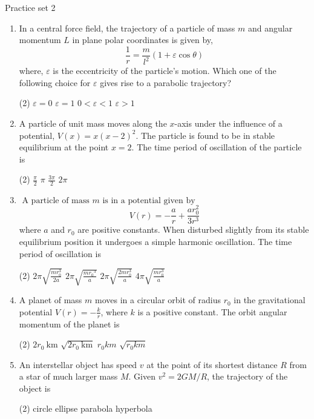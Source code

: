 \newpage
\begin{abox}
	Practice set 2
	\end{abox}
\begin{enumerate}
	\item In a central force field, the trajectory of a particle of mass $m$ and angular momentum $L$ in plane polar coordinates is given by,\\
	$$\frac{1}{r}=\frac{m}{l^{2}}(1+\varepsilon \cos \theta)$$
	where, $\varepsilon$ is the eccentricity of the particle's motion. Which one of the following choice for $\varepsilon$ gives rise to a parabolic trajectory?
	{}
\begin{tasks}(2)
	\task[\textbf{A.}] $\varepsilon=0$
	\task[\textbf{B.}]$\varepsilon=1$
	\task[\textbf{C.}] $0<\varepsilon<1$
	\task[\textbf{D.}] $\varepsilon>1$
\end{tasks}
	\item A particle of unit mass moves along the $x$-axis under the influence of a potential, $V(x)=x(x-2)^{2}$. The particle is found to be in stable equilibrium at the point $x=2$. The time period of oscillation of the particle is
	{}
\begin{tasks}(2)
	\task[\textbf{A.}] $\frac{\pi}{2}$
	\task[\textbf{B.}]$\pi$
	\task[\textbf{C.}]$\frac{3 \pi}{2}$
	\task[\textbf{D.}] $2 \pi$
\end{tasks}
	\item $\text { A particle of mass } m \text { is in a potential given by }$
	$$V(r)=-\frac{a}{r}+\frac{a r_{0}^{2}}{3 r^{3}}$$
	where $a$ and $r_{0}$ are positive constants. When disturbed slightly from its stable equilibrium position it undergoes a simple harmonic oscillation. The time period of oscillation is
	{}
\begin{tasks}(2)
	\task[\textbf{A.}] $2 \pi \sqrt{\frac{m r_{0}^{3}}{2 a}}$
	\task[\textbf{B.}]$2 \pi \sqrt{\frac{m r_{0}{ }^{3}}{a}}$
	\task[\textbf{C.}]$2 \pi \sqrt{\frac{2 m r_{0}^{3}}{a}}$
	\task[\textbf{D.}]$4 \pi \sqrt{\frac{m r_{0}^{3}}{a}}$
\end{tasks}

	\item A planet of mass $m$ moves in a circular orbit of radius $r_{0}$ in the gravitational potential $V(r)=-\frac{k}{r}$, where $k$ is a positive constant. The orbit angular momentum of the planet is
	{}
\begin{tasks}(2)
	\task[\textbf{A.}] $2 r_{0} \mathrm{~km}$
	\task[\textbf{B.}]$\sqrt{2 r_{0} \mathrm{~km}}$
	\task[\textbf{C.}]$r_{0} k m$
	\task[\textbf{D.}]$\sqrt{r_{0} k m}$
\end{tasks}
	\item An interstellar object has speed $v$ at the point of its shortest distance $R$ from a star of much larger mass $M$. Given $v^{2}=2 G M / R$, the trajectory of the object is
	{}
\begin{tasks}(2)
	\task[\textbf{A.}] circle
	\task[\textbf{B.}]ellipse
	\task[\textbf{C.}]parabola
	\task[\textbf{D.}]hyperbola
\end{tasks}
\end{enumerate}
